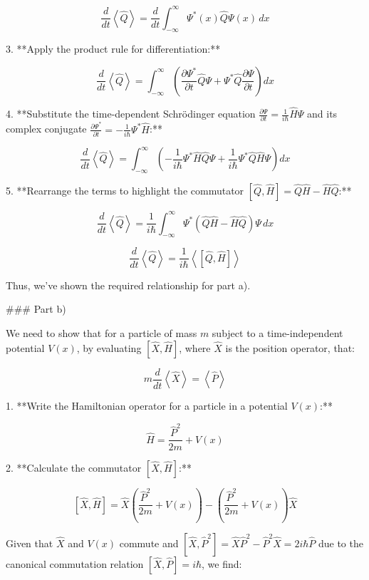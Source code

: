 \documentclass[a4paper,11pt]{article}
\begin{document}
\[ \frac{d}{dt}\left<\hat{Q}\right> = \frac{d}{dt}\int_{-\infty}^{\infty} \Psi^{*}(x) \hat{Q} \Psi(x) \, dx \]

3. **Apply the product rule for differentiation:**

\[ \frac{d}{dt}\left<\hat{Q}\right> = \int_{-\infty}^{\infty} \left( \frac{\partial \Psi^{*}}{\partial t} \hat{Q} \Psi + \Psi^{*} \hat{Q} \frac{\partial \Psi}{\partial t} \right) dx \]

4. **Substitute the time-dependent Schrödinger equation \( \frac{\partial\Psi}{\partial t} = \frac{1}{i\hbar}\hat{H}\Psi \) and its complex conjugate \( \frac{\partial\Psi^{*}}{\partial t} = -\frac{1}{i\hbar}\Psi^{*}\hat{H} \):**

\[ \frac{d}{dt}\left<\hat{Q}\right> = \int_{-\infty}^{\infty} \left( -\frac{1}{i\hbar}\Psi^{*} \hat{H} \hat{Q} \Psi + \frac{1}{i\hbar}\Psi^{*} \hat{Q} \hat{H} \Psi \right) dx \]

5. **Rearrange the terms to highlight the commutator \( \left[ \hat{Q}, \hat{H} \right] = \hat{Q}\hat{H} - \hat{H}\hat{Q} \):**

\[ \frac{d}{dt}\left<\hat{Q}\right> = \frac{1}{i\hbar}\int_{-\infty}^{\infty} \Psi^{*} \left( \hat{Q}\hat{H} - \hat{H}\hat{Q} \right) \Psi \, dx \]

\[ \frac{d}{dt}\left<\hat{Q}\right> = \frac{1}{i\hbar}\left< \left[ \hat{Q}, \hat{H} \right] \right> \]

Thus, we've shown the required relationship for part a).

### Part b)

We need to show that for a particle of mass \( m \) subject to a time-independent potential \( V(x) \), by evaluating \( \left[ \hat{X}, \hat{H}\right] \), where \( \hat{X} \) is the position operator, that:

\[ m\frac{d}{dt}\left<\hat{X}\right> = \left<\hat{P}\right> \]

1. **Write the Hamiltonian operator for a particle in a potential \( V(x) \):**

\[ \hat{H} = \frac{\hat{P}^2}{2m} + V(x) \]

2. **Calculate the commutator \( \left[ \hat{X}, \hat{H}\right] \):**

\[ \left[ \hat{X}, \hat{H}\right] = \hat{X}\left(\frac{\hat{P}^2}{2m} + V(x)\right) - \left(\frac{\hat{P}^2}{2m} + V(x)\right)\hat{X} \]

Given that \( \hat{X} \) and \( V(x) \) commute and \( \left[ \hat{X}, \hat{P}^2 \right] = \hat{X}\hat{P}^2 - \hat{P}^2\hat{X} = 2i\hbar\hat{P} \) due to the canonical commutation relation \( \left[ \hat{X}, \hat{P} \right] = i\hbar \), we find:
\end{document}
